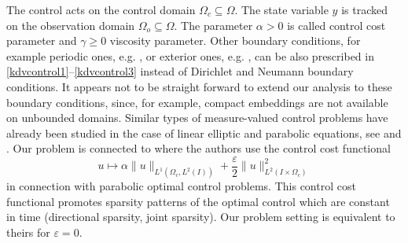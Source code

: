 The control acts on the control domain $\Omega_c\subseteq \Omega$. The state variable $y$ is tracked on the observation domain $\Omega_{o}\subseteq\Omega$. The parameter $\alpha > 0$ is called control cost parameter and  $\gamma \geq 0$ viscosity parameter. {\color{red} Other boundary conditions, for example periodic ones, e.g. \cite{Bourgain93}, or exterior ones, e.g. \cite{BonaWinther83}, can be also prescribed in \eqref{kdvcontrol1}--\eqref{kdvcontrol3} instead of Dirichlet and Neumann boundary conditions. It appears not to be straight forward to extend our analysis to these boundary conditions, since, for example, compact embeddings are not available on unbounded domains.} %
Similar types of measure-valued control problems have already been studied in the case of linear elliptic and parabolic equations, see \cite{pieper2013priori,clason2011duality,casas2012approximation,ClasonKunisch:2011b} and \cite{casas2013parabolic,CasasZuazua13,CasasVexlerZuazua13,CasasKunisch15}. Our problem is connected to \cite{herzog2012directional} where the authors use the control cost functional
\[
u\mapsto\alpha \|u\|_{L^1(\Omega_c,L^2(I))}+\frac \varepsilon 2 \|u\|_{L^2(I\times \Omega_c)}^2
\]
in connection with parabolic optimal control problems. This control cost functional promotes sparsity patterns of the optimal control which are constant in time (directional sparsity, joint sparsity). Our problem setting is equivalent to theirs for $\varepsilon=0$. %
